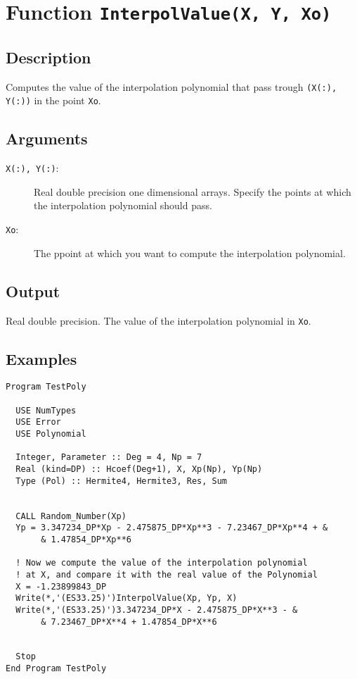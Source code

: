\section{Function \texttt{InterpolValue(X, Y, Xo)}}

\subsection{Description}

Computes the value of the interpolation polynomial that pass trough
\texttt{(X(:), Y(:))} in the point \texttt{Xo}.

\subsection{Arguments}

\begin{description}
\item[\texttt{X(:), Y(:)}:] Real double precision one dimensional
  arrays. Specify the points at which the interpolation polynomial
  should pass. 
\item[\texttt{Xo}:] The ppoint at which you want to compute the
  interpolation polynomial.
\end{description}

\subsection{Output}

Real double precision. The value of the interpolation polynomial in
\texttt{Xo}. 


\subsection{Examples}

\begin{verbatim}
Program TestPoly

  USE NumTypes
  USE Error
  USE Polynomial

  Integer, Parameter :: Deg = 4, Np = 7
  Real (kind=DP) :: Hcoef(Deg+1), X, Xp(Np), Yp(Np)
  Type (Pol) :: Hermite4, Hermite3, Res, Sum


  CALL Random_Number(Xp)
  Yp = 3.347234_DP*Xp - 2.475875_DP*Xp**3 - 7.23467_DP*Xp**4 + &
       & 1.47854_DP*Xp**6

  ! Now we compute the value of the interpolation polynomial
  ! at X, and compare it with the real value of the Polynomial
  X = -1.23899843_DP
  Write(*,'(ES33.25)')InterpolValue(Xp, Yp, X)
  Write(*,'(ES33.25)')3.347234_DP*X - 2.475875_DP*X**3 - &
       & 7.23467_DP*X**4 + 1.47854_DP*X**6


  Stop
End Program TestPoly
\end{verbatim}

